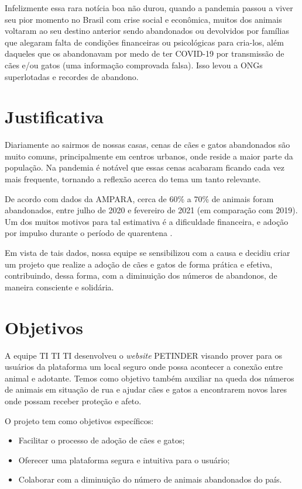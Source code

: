 Infelizmente essa rara notícia boa não durou, quando a pandemia passou a viver seu pior momento no Brasil com crise social e econômica, muitos dos animais voltaram ao seu destino anterior sendo abandonados ou devolvidos por famílias que alegaram falta de condições financeiras ou psicológicas para cria-los, além daqueles que os abandonavam por medo de ter \gls{COVID-19} por transmissão de cães e/ou gatos (uma informação comprovada falsa). Isso levou a \ac{ONGs} superlotadas e recordes de abandono.

\section{Justificativa}
Diariamente ao sairmos de nossas casas, cenas de cães e gatos abandonados são muito comuns, principalmente em centros urbanos, onde reside a maior parte da população. Na pandemia é notável que essas cenas acabaram ficando cada vez mais frequente, tornando a reflexão acerca do tema um tanto relevante.

De acordo com dados da \gls{AMPARA}, cerca de 60\% a 70\% de animais foram abandonados, entre julho de 2020 e fevereiro de 2021 (em comparação com 2019). Um dos muitos motivos para tal estimativa é a dificuldade financeira, e adoção por impulso durante o período de quarentena \cite{abandono}.

Em vista de tais dados, nossa equipe se sensibilizou com a causa e decidiu criar um projeto que realize a adoção de cães e gatos de forma prática e efetiva, contribuindo, dessa forma, com a diminuição dos números de abandonos, de maneira consciente e solidária.

\section{Objetivos}

A equipe TI TI TI desenvolveu o \textit{website} PETINDER visando prover para os usuários da plataforma um local seguro onde possa acontecer a conexão entre animal e adotante. Temos como objetivo também auxiliar na queda dos números de animais em situação de rua e ajudar cães e gatos a encontrarem novos lares onde possam receber proteção e afeto.

O projeto tem como objetivos específicos:

\begin{itemize}
\item Facilitar o processo de adoção de cães e gatos;
\item Oferecer uma plataforma segura e intuitiva para o usuário;
\item Colaborar com a diminuição do número de animais abandonados do país.
\end{itemize}

